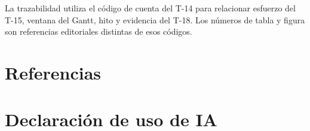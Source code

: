\documentclass[11pt]{article}
\begin{document}
La trazabilidad utiliza el código de cuenta del T-14 para relacionar esfuerzo del T-15, ventana del Gantt, hito y evidencia del T-18. Los números de tabla y figura son referencias editoriales distintas de esos códigos.


\section*{Referencias}



\section*{Declaración de uso de IA}



\ossFinalPage
\end{document}
